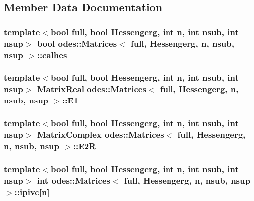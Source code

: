 \subsection{Member Data Documentation}
\hypertarget{classodes_1_1Matrices_a82e935680c27f58bcff8a559700411c6}{}
\subsubsection[{calhes}]{\setlength{\rightskip}{0pt plus 5cm}template$<$bool full, bool Hessengerg, int n, int nsub, int nsup$>$ bool {\bf odes\+::\+Matrices}$<$ full, Hessengerg, n, nsub, nsup $>$\+::calhes\hspace{0.3cm}{\ttfamily [protected]}}\label{classodes_1_1Matrices_a82e935680c27f58bcff8a559700411c6}
\hypertarget{classodes_1_1Matrices_afba5034652d2298f7f8ad01468a1bdbd}{}
\subsubsection[{E1}]{\setlength{\rightskip}{0pt plus 5cm}template$<$bool full, bool Hessengerg, int n, int nsub, int nsup$>$ {\bf Matrix\+Real} {\bf odes\+::\+Matrices}$<$ full, Hessengerg, n, nsub, nsup $>$\+::E1\hspace{0.3cm}{\ttfamily [private]}}\label{classodes_1_1Matrices_afba5034652d2298f7f8ad01468a1bdbd}
\hypertarget{classodes_1_1Matrices_a62ad6fe606146f2957ff8d428da1867d}{}
\subsubsection[{E2\+R}]{\setlength{\rightskip}{0pt plus 5cm}template$<$bool full, bool Hessengerg, int n, int nsub, int nsup$>$ {\bf Matrix\+Complex} {\bf odes\+::\+Matrices}$<$ full, Hessengerg, n, nsub, nsup $>$\+::E2\+R\hspace{0.3cm}{\ttfamily [private]}}\label{classodes_1_1Matrices_a62ad6fe606146f2957ff8d428da1867d}
\hypertarget{classodes_1_1Matrices_a32b17a76a3380307a8fe5e6aa1395e4a}{}
\subsubsection[{ipivc}]{\setlength{\rightskip}{0pt plus 5cm}template$<$bool full, bool Hessengerg, int n, int nsub, int nsup$>$ int {\bf odes\+::\+Matrices}$<$ full, Hessengerg, n, nsub, nsup $>$\+::ipivc\mbox{[}n\mbox{]}\hspace{0.3cm}{\ttfamily [private]}}\label{classodes_1_1Matrices_a32b17a76a3380307a8fe5e6aa1395e4a}
\hypertarget{classodes_1_1Matrices_ac7c747721a0d2ca7f9b792f25ce07ea9}{}
